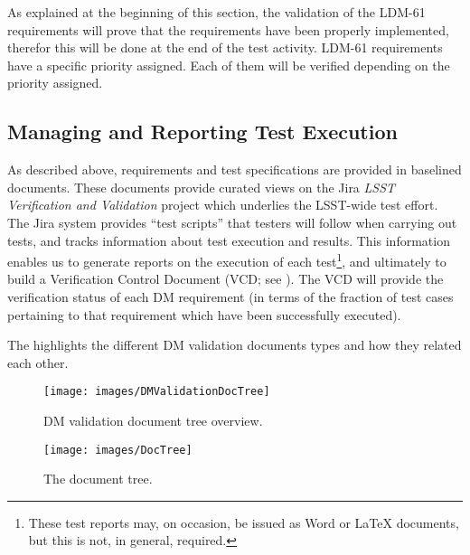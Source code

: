 As explained at the beginning of this section, the validation of the LDM-61 requirements will prove that the \product{} requirements have been properly implemented, therefor this will be done at the end of the test activity.
LDM-61 requirements have a specific priority assigned. Each of them will be verified depending on the priority assigned.

\subsection{Managing and Reporting Test Execution}
\label{sect:reports}

As described above, requirements and test specifications are provided in baselined documents.
These documents provide curated views on the Jira \emph{LSST Verification and Validation} project which underlies the LSST-wide test effort.
The Jira system provides ``test scripts'' that testers will follow when carrying out tests, and tracks information about test execution and results.
This information enables us to generate reports on the execution of each test\footnote{These test reports may, on occasion, be issued as Word or LaTeX documents, but this is not, in general, required.}, and ultimately to build a Verification Control Document (VCD; see ).
The VCD will provide the verification status of each DM requirement (in terms of the fraction of test cases pertaining to that requirement which have been successfully executed).


The  highlights the different DM validation documents types and how they related each other.

\begin{figure}[htbp]
        \begin{center}
                \texttt{[image: images/DMValidationDocTree]}
                \caption{DM validation document tree overview.}
                \label{fig:dmvaldoctree}
        \end{center}
\end{figure}



\begin{figure}
\begin{center}
 \texttt{[image: images/DocTree]}

 \caption{The \product{} document tree.}
 \label{fig:doctree}

\end{center}
\end{figure}

